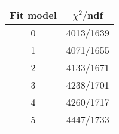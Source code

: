 \begin{tabular}{c|c}
Fit model & $\chi^2/$ndf \\
\hline
0 & 4013/1639\\
1 & 4071/1655\\
2 & 4133/1671\\
3 & 4238/1701\\
4 & 4260/1717\\
5 & 4447/1733\\
\end{tabular}

